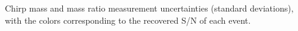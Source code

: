 \label{fig:mass_std_snr} Chirp mass and mass ratio measurement uncertainties (standard deviations), with the colors corresponding to the recovered S/N of each event.